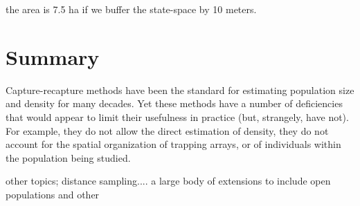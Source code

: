 \documentclass{book}
\begin{document}
the area is 7.5 ha if we buffer the state-space by 10 meters. 





\section{Summary}

Capture-recapture methods have been the standard for estimating
population size and density for many decades.  Yet these methods have
a number of deficiencies that would appear to limit their usefulness
in practice (but, strangely, have not). For example, they do not allow
the direct estimation of density, they do not account for the spatial
organization of trapping arrays, or of individuals within the
population being studied. 


other topics; distance sampling....
a large body
of extensions to include open populations and other 
\end{document}
